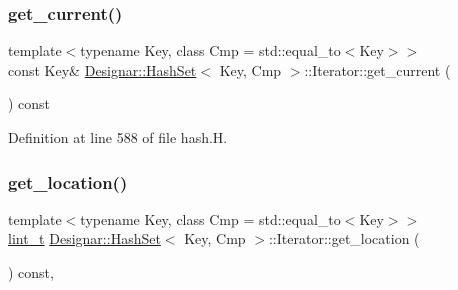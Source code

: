 \mbox{\label{class_designar_1_1_hash_set_1_1_iterator_aed6b09996733067a2aa5e48b702ba9a2}} 
\subsubsection{\texorpdfstring{get\+\_\+current()}{get\_current()}\hspace{0.1cm}{\footnotesize\ttfamily [2/2]}}
{\footnotesize\ttfamily template$<$typename Key, class Cmp = std\+::equal\+\_\+to$<$\+Key$>$$>$ \\
const Key\& \hyperlink{class_designar_1_1_hash_set}{Designar\+::\+Hash\+Set}$<$ Key, Cmp $>$\+::Iterator\+::get\+\_\+current (\begin{DoxyParamCaption}{ }\end{DoxyParamCaption}) const\hspace{0.3cm}{\ttfamily [inline]}}



Definition at line 588 of file hash.\+H.

\mbox{\label{class_designar_1_1_hash_set_1_1_iterator_a8616bd592e20ebadab10de5c78a56eda}} 
\subsubsection{\texorpdfstring{get\+\_\+location()}{get\_location()}}
{\footnotesize\ttfamily template$<$typename Key, class Cmp = std\+::equal\+\_\+to$<$\+Key$>$$>$ \\
\hyperlink{namespace_designar_a9d113d66a39e82b73727c72cd3a52f73}{lint\+\_\+t} \hyperlink{class_designar_1_1_hash_set}{Designar\+::\+Hash\+Set}$<$ Key, Cmp $>$\+::Iterator\+::get\+\_\+location (\begin{DoxyParamCaption}{ }\end{DoxyParamCaption}) const\hspace{0.3cm}{\ttfamily [inline]}, {\ttfamily [protected]}}



